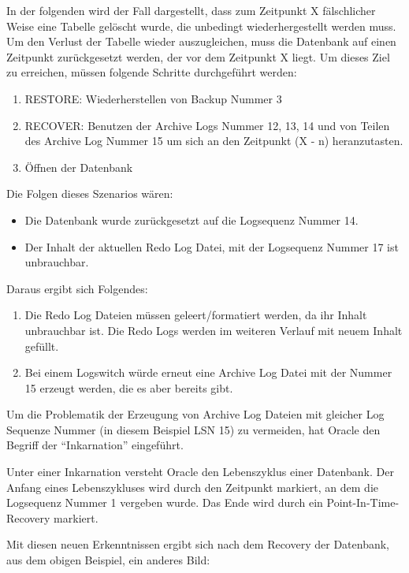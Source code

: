         In der folgenden  wird der Fall dargestellt, dass zum Zeitpunkt X fälschlicher Weise eine Tabelle gelöscht wurde, die unbedingt wiederhergestellt werden muss.
        Um den Verlust der Tabelle wieder auszugleichen, muss die Datenbank auf einen Zeitpunkt zurückgesetzt werden, der vor dem Zeitpunkt X liegt.
        Um dieses Ziel zu erreichen, müssen folgende Schritte durchgeführt
        werden:
        \begin{enumerate}
          \item RESTORE: Wiederherstellen von Backup Nummer 3
          \item RECOVER: Benutzen der Archive Logs Nummer 12, 13, 14 und von Teilen des Archive Log Nummer 15 um sich an den Zeitpunkt (X - n) heranzutasten.
          \item Öffnen der Datenbank
        \end{enumerate}
        Die Folgen dieses Szenarios wären:
        \begin{itemize}
          \item Die Datenbank wurde zurückgesetzt auf die Logsequenz Nummer 14.
          \item Der Inhalt der aktuellen Redo Log Datei, mit der Logsequenz Nummer 17 ist unbrauchbar.
        \end{itemize}
        Daraus ergibt sich Folgendes:
        \begin{enumerate}
          \item Die Redo Log Dateien müssen geleert/formatiert werden, da ihr Inhalt unbrauchbar ist. Die Redo Logs werden im weiteren Verlauf mit neuem Inhalt gefüllt.
          \item Bei einem Logswitch würde erneut eine Archive Log Datei mit der Nummer 15 erzeugt werden, die es aber bereits gibt.
        \end{enumerate}
        Um die Problematik der Erzeugung von Archive Log Dateien mit gleicher Log Sequenze Nummer (in diesem Beispiel LSN 15) zu vermeiden, hat Oracle den Begriff der \enquote{Inkarnation} eingeführt.
        \begin{merke}
          Unter einer Inkarnation versteht Oracle den Lebenszyklus einer Datenbank. Der Anfang eines Lebenszykluses wird durch den Zeitpunkt markiert, an dem die Logsequenz Nummer 1 vergeben wurde. Das Ende wird durch ein Point-In-Time-Recovery markiert.
        \end{merke}
        Mit diesen neuen Erkenntnissen ergibt sich nach dem Recovery der Datenbank, aus dem obigen Beispiel, ein anderes Bild:

